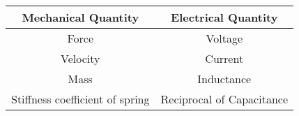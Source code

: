 \begin{tabular}{|c|c|} 
    \hline
\textbf{Mechanical Quantity} & \textbf{Electrical Quantity}  \\\hline
    Force & Voltage  \\\hline
    Velocity & Current  \\\hline
    Mass & Inductance  \\\hline
    Stiffness coefficient of spring& Reciprocal of Capacitance  \\\hline
    \end{tabular}
    
